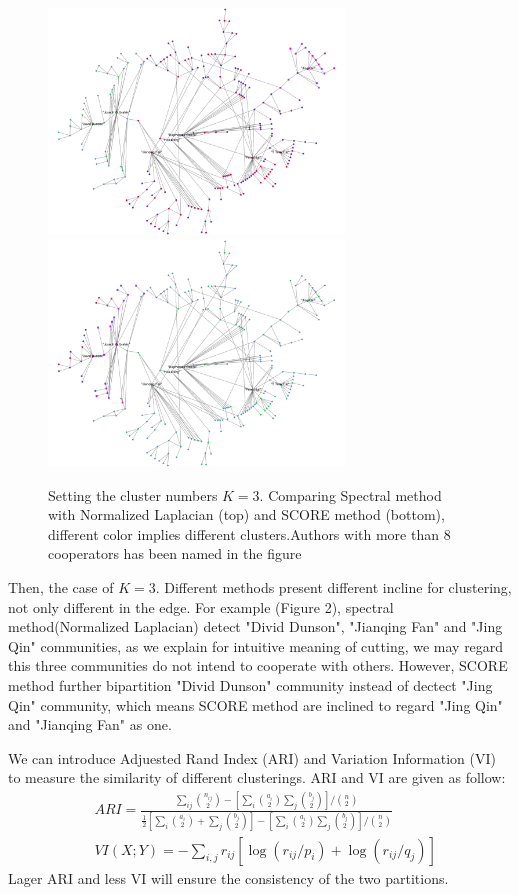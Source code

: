 \documentclass{article}
\numberwithin{equation}{section}
\begin{document}
\begin{figure}[H]
	\centering
	\includegraphics[width=0.7\textwidth]{compare-3/giantcoau-spcnsym-3.png}
	\includegraphics[width=0.7\textwidth]{compare-3/giantcoau-score-3.png}
	\caption{Setting the cluster numbers $K=3$. Comparing Spectral method with Normalized Laplacian (top) and SCORE method (bottom), different color implies different clusters.Authors with more than 8 cooperators has been named in the figure}
\end{figure}

Then, the case of $K=3$. Different methods present different incline for clustering, not only different in the edge. For example (Figure 2), spectral method(Normalized Laplacian) detect "Divid Dunson", "Jianqing Fan" and  "Jing Qin" communities, as we explain for intuitive meaning of cutting, we may regard this three communities do not intend to cooperate with others. However, SCORE method further bipartition "Divid Dunson" community instead of dectect "Jing Qin" community, which means SCORE method are inclined to regard "Jing Qin" and "Jianqing Fan" as one.

We can introduce Adjuested Rand Index (ARI) and Variation Information (VI) to measure the similarity of different clusterings. ARI and VI are given as follow:
	\[ \begin{aligned}
	& ARI=\frac{\sum_{ij}\binom{n_{ij}}{2}-\left[\sum_i\binom{a_i}{2}\sum_{j}\binom{b_j}{2}\right]/ \binom{n}{2}}{\frac{1}{2}\left[\sum_i\binom{a_i}{2}+\sum_{j}\binom{b_j}{2}\right]-\left[\sum_i\binom{a_i}{2}\sum_{j}\binom{b_j}{2}\right]/ \binom{n}{2}} \\
	& VI(X;Y)=-\sum\limits_{i,j} r_{ij}[\log(r_{ij}/p_i)+\log(r_{ij}/q_j)]
	\end{aligned}\]
Lager ARI and less VI will ensure the consistency of the two partitions.
\end{document}
